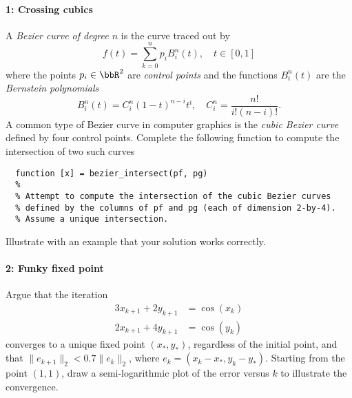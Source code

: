 \documentclass[12pt, leqno]{article}
\begin{document}

\paragraph*{1: Crossing cubics}
A {\em Bezier curve of degree $n$} is the curve traced out by
\[
  f(t) = \sum_{k=0}^n p_i B_i^n(t), \quad t \in [0,1]
\]
where the points $p_i \in \bbR^2$ are {\em control points} and
the functions $B_i^n(t)$ are the {\em Bernstein polynomials}
\[
  B_i^n(t) = C^n_i (1-t)^{n-i} t^i, \quad C^n_i = \frac{n!}{i!(n-i)!}.
\]
A common type of Bezier curve in computer graphics is the {\em cubic
  Bezier curve} defined by four control points.  Complete the
following function to compute the intersection of two such curves
\begin{lstlisting}
  function [x] = bezier_intersect(pf, pg)
  %
  % Attempt to compute the intersection of the cubic Bezier curves
  % defined by the columns of pf and pg (each of dimension 2-by-4).
  % Assume a unique intersection.
\end{lstlisting}
Illustrate with an example that your solution works correctly.

\paragraph*{2: Funky fixed point}
Argue that the iteration
\begin{align*}
  3x_{k+1} + 2y_{k+1} &= \cos(x_k) \\
  2x_{k+1} + 4y_{k+1} &= \cos(y_k)
\end{align*}
converges to a unique fixed point $(x_*, y_*)$, regardless of
the initial point, and that $\|e_{k+1}\|_2 < 0.7 \|e_k\|_2$, where
$e_k = (x_k-x_*, y_k-y_*)$.  Starting from the point $(1,1)$,
draw a semi-logarithmic plot of the error versus $k$ to illustrate
the convergence.
\end{document}
